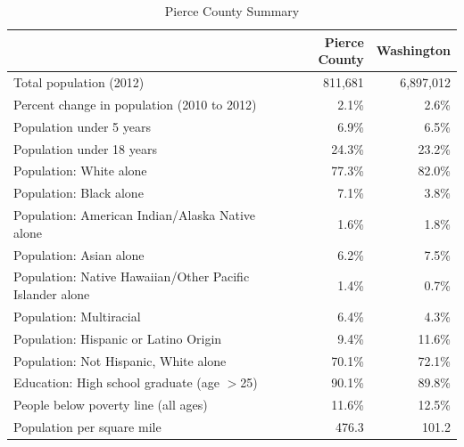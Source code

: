 \documentclass{article}\usepackage{graphicx, color}
\begin{document}
\begin{table}[ht]
\centering
\caption{Pierce County Summary} 
\begin{tabular}{lrr}
  \toprule
 & Pierce County & Washington \\ 
  \midrule
Total population (2012) & 811,681 & 6,897,012 \\ 
  Percent change in population (2010 to 2012) & 2.1\% & 2.6\% \\ 
  Population under 5 years & 6.9\% & 6.5\% \\ 
  Population under 18 years & 24.3\% & 23.2\% \\ 
  Population: White alone & 77.3\% & 82.0\% \\ 
  Population: Black alone & 7.1\% & 3.8\% \\ 
  Population: American Indian/Alaska Native alone & 1.6\% & 1.8\% \\ 
  Population: Asian alone & 6.2\% & 7.5\% \\ 
  Population: Native Hawaiian/Other Pacific Islander alone & 1.4\% & 0.7\% \\ 
  Population: Multiracial & 6.4\% & 4.3\% \\ 
  Population: Hispanic or Latino Origin & 9.4\% & 11.6\% \\ 
  Population: Not Hispanic, White alone & 70.1\% & 72.1\% \\ 
  Education: High school graduate (age $>$25) & 90.1\% & 89.8\% \\ 
  People below poverty line (all ages) & 11.6\% & 12.5\% \\ 
  Population per square mile & 476.3 & 101.2 \\ 
   \bottomrule
\end{tabular}
\end{table}
\end{document}
